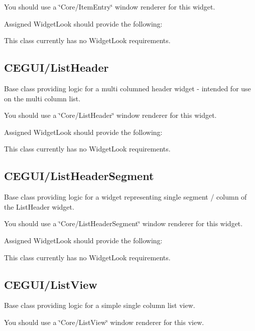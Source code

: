 You should use a \char`\"{}\+Core/\+Item\+Entry\char`\"{} window renderer for this widget.

Assigned Widget\+Look should provide the following\+: 
\begin{DoxyItemize}
\item This class currently has no Widget\+Look requirements. 
\end{DoxyItemize}\hypertarget{fal_baseclass_ref_fal_baseclass_ref_sec_9}{}\subsection{C\+E\+G\+U\+I/\+List\+Header}\label{fal_baseclass_ref_fal_baseclass_ref_sec_9}
Base class providing logic for a multi columned header widget -\/ intended for use on the multi column list.

You should use a \char`\"{}\+Core/\+List\+Header\char`\"{} window renderer for this widget.

Assigned Widget\+Look should provide the following\+: 
\begin{DoxyItemize}
\item This class currently has no Widget\+Look requirements. 
\end{DoxyItemize}\hypertarget{fal_baseclass_ref_fal_baseclass_ref_sec_10}{}\subsection{C\+E\+G\+U\+I/\+List\+Header\+Segment}\label{fal_baseclass_ref_fal_baseclass_ref_sec_10}
Base class providing logic for a widget representing single segment / column of the List\+Header widget.

You should use a \char`\"{}\+Core/\+List\+Header\+Segment\char`\"{} window renderer for this widget.

Assigned Widget\+Look should provide the following\+: 
\begin{DoxyItemize}
\item This class currently has no Widget\+Look requirements. 
\end{DoxyItemize}\hypertarget{fal_baseclass_ref_fal_baseclass_ref_sec_11}{}\subsection{C\+E\+G\+U\+I/\+List\+View}\label{fal_baseclass_ref_fal_baseclass_ref_sec_11}
Base class providing logic for a simple single column list view.

You should use a \char`\"{}\+Core/\+List\+View\char`\"{} window renderer for this view.

